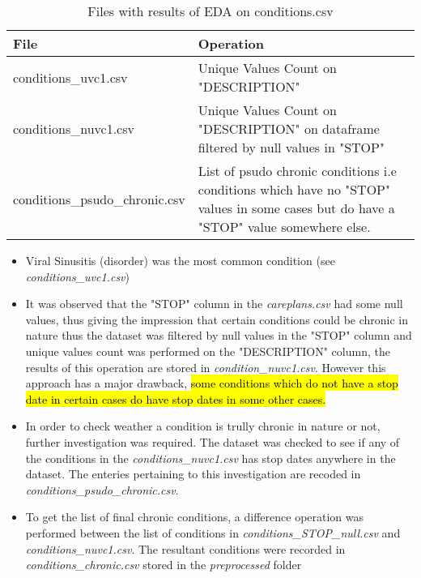 \documentclass[12pt, twosided]{report}  %
\begin{document}
\begin{table}[H]
	\centering
	\begin{tabular}{p{5cm}|p{14.5cm}}
		\textbf{File}                & \textbf{Operation} \\ \hline
		conditions\_uvc1.csv     & Unique Values Count on "DESCRIPTION"   \\
		conditions\_nuvc1.csv    & Unique Values Count on "DESCRIPTION"  on dataframe filtered by null values in "STOP" \\
		conditions\_psudo\_chronic.csv & List of psudo chronic conditions i.e conditions which have no "STOP" values in some cases but do have a "STOP" value somewhere else.
	\end{tabular}
	\caption{Files with results of EDA on conditions.csv}
\end{table}

\begin{itemize}
	\item Viral Sinusitis (disorder) was the most common condition (see \textit{conditions\_uvc1.csv})
	
	\item It was observed that the "STOP" column in the \textit{careplans.csv} had some null values, thus giving the impression that certain conditions could be chronic in nature thus the dataset was filtered by null values in the "STOP" column and unique values count was performed on the "DESCRIPTION" column, the results of this operation are stored in \textit{condition\_nuvc1.csv}. However this approach has a major drawback, \hl{some conditions which do not have a stop date in certain cases do have stop dates in some other cases.} 
	
	\item In order to check weather a condition is trully chronic in nature or not, further investigation was required. The dataset was checked to see if any of the conditions in the \textit{conditions\_nuvc1.csv} has stop dates anywhere in the dataset. The enteries pertaining to this investigation are recoded in \textit{conditions\_psudo\_chronic.csv}.
	
	\item To get the list of final chronic conditions, a difference operation was performed between the list of conditions in \textit{conditions\_STOP\_null.csv} and \textit{conditions\_nuvc1.csv}. The resultant conditions were recorded in \textit{conditions\_chronic.csv} stored in the \textit{preprocessed} folder
\end{itemize}
\end{document}
